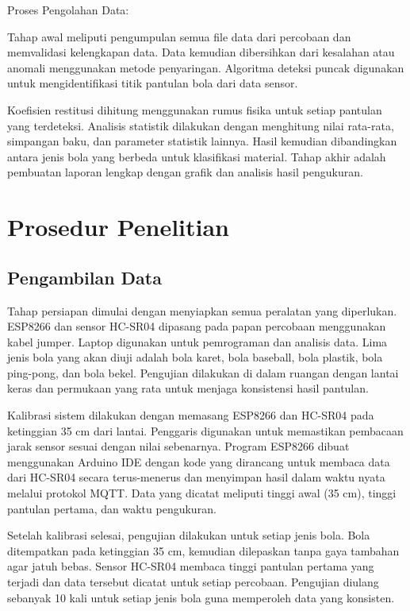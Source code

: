 Proses Pengolahan Data:

Tahap awal meliputi pengumpulan semua file data dari percobaan dan memvalidasi kelengkapan data. Data kemudian dibersihkan dari kesalahan atau anomali menggunakan metode penyaringan. Algoritma deteksi puncak digunakan untuk mengidentifikasi titik pantulan bola dari data sensor.

Koefisien restitusi dihitung menggunakan rumus fisika untuk setiap pantulan yang terdeteksi. Analisis statistik dilakukan dengan menghitung nilai rata-rata, simpangan baku, dan parameter statistik lainnya. Hasil kemudian dibandingkan antara jenis bola yang berbeda untuk klasifikasi material. Tahap akhir adalah pembuatan laporan lengkap dengan grafik dan analisis hasil pengukuran.

\section{Prosedur Penelitian}
\subsection{Pengambilan Data}
Tahap persiapan dimulai dengan menyiapkan semua peralatan yang diperlukan. ESP8266 dan sensor HC-SR04 dipasang pada papan percobaan menggunakan kabel jumper. Laptop digunakan untuk pemrograman dan analisis data. Lima jenis bola yang akan diuji adalah bola karet, bola baseball, bola plastik, bola ping-pong, dan bola bekel. Pengujian dilakukan di dalam ruangan dengan lantai keras dan permukaan yang rata untuk menjaga konsistensi hasil pantulan.

Kalibrasi sistem dilakukan dengan memasang ESP8266 dan HC-SR04 pada ketinggian 35 cm dari lantai. Penggaris digunakan untuk memastikan pembacaan jarak sensor sesuai dengan nilai sebenarnya. Program ESP8266 dibuat menggunakan Arduino IDE dengan kode yang dirancang untuk membaca data dari HC-SR04 secara terus-menerus dan menyimpan hasil dalam waktu nyata melalui protokol MQTT. Data yang dicatat meliputi tinggi awal (35 cm), tinggi pantulan pertama, dan waktu pengukuran.

Setelah kalibrasi selesai, pengujian dilakukan untuk setiap jenis bola. Bola ditempatkan pada ketinggian 35 cm, kemudian dilepaskan tanpa gaya tambahan agar jatuh bebas. Sensor HC-SR04 membaca tinggi pantulan pertama yang terjadi dan data tersebut dicatat untuk setiap percobaan. Pengujian diulang sebanyak 10 kali untuk setiap jenis bola guna memperoleh data yang konsisten.

